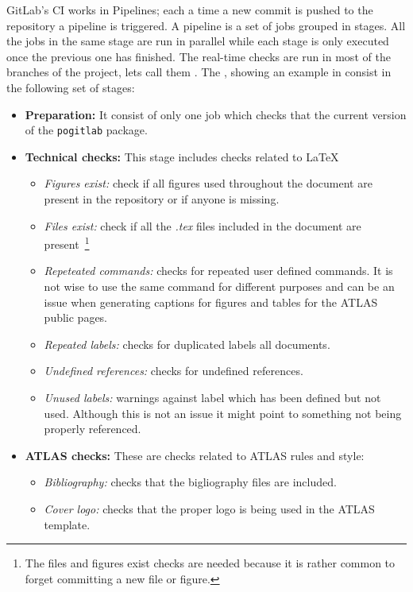 GitLab's CI works in Pipelines; each a time a new commit is pushed to the repository a pipeline is triggered. A pipeline is a set of jobs grouped in stages. All the jobs in the same stage are run in parallel while each stage is only executed once the previous one has finished. The real-time checks are run in most of the branches of the project, lets call them \epipes. The \epipes, showing an example in \Fig{\ref{fig:edit-pipe}} consist in the following set of stages:

\begin{itemize}
  \item \textbf{Preparation:} It consist of only one job which checks that the current version of the \texttt{pogitlab} package.
  \item \textbf{Technical checks:} This stage includes checks related to \LaTeX\:
  \begin{itemize}
    \item \textit{Figures exist:} check if all figures used throughout the document are present in the repository or if anyone is missing.
    \item \textit{Files exist:} check if all the \textit{.tex} files included in the document are present~\footnote{The files and figures exist checks are needed because it is rather common to forget committing a new file or figure.}
    \item \textit{Repeteated commands:} checks for repeated user defined commands. It is not wise to use the same command for different purposes and can be an issue when generating captions for figures and tables for the ATLAS public pages.
    \item \textit{Repeated labels:} checks for duplicated labels all documents.
    \item \textit{Undefined references:} checks for undefined references.
    \item \textit{Unused labels:} warnings against label which has been defined but not used. Although this is not an issue it might point to something not being properly referenced.
  \end{itemize}
  \item \textbf{ATLAS checks:} These are checks related to ATLAS rules and style:
  \begin{itemize}
    \item \textit{Bibliography:} checks that the bigliography files are included.
    \item \textit{Cover logo:} checks that the proper logo is being used in the ATLAS template.

\end{itemize}
\end{itemize}
